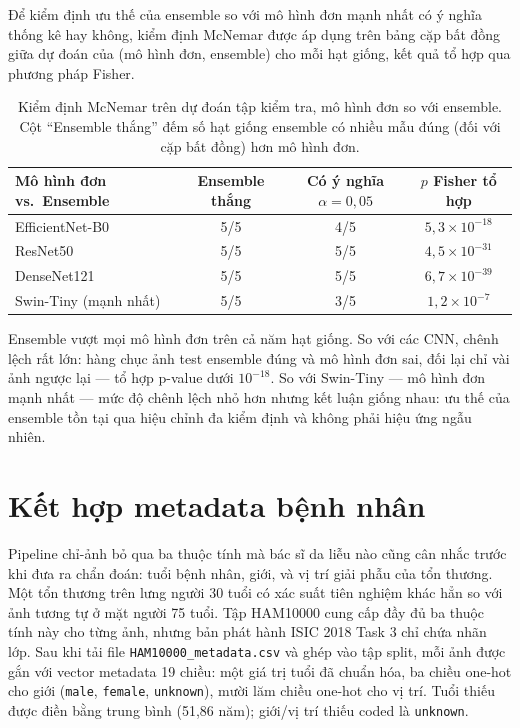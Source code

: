 Để kiểm định ưu thế của ensemble so với mô hình đơn mạnh nhất có ý nghĩa thống kê hay không, kiểm định McNemar được áp dụng trên bảng cặp bất đồng giữa dự đoán của (mô hình đơn, ensemble) cho mỗi hạt giống, kết quả tổ hợp qua phương pháp Fisher.

\begin{table}[H]
\centering
\caption{Kiểm định McNemar trên dự đoán tập kiểm tra, mô hình đơn so với ensemble. Cột ``Ensemble thắng'' đếm số hạt giống ensemble có nhiều mẫu đúng (đối với cặp bất đồng) hơn mô hình đơn.}
\label{tab:mcnemar_vn}
\begin{tabular}{lccc}
\toprule
\textbf{Mô hình đơn vs.\ Ensemble} & \textbf{Ensemble thắng} & \textbf{Có ý nghĩa $\alpha=0{,}05$} & \textbf{$p$ Fisher tổ hợp} \\
\midrule
EfficientNet-B0 & 5/5 & 4/5 & $5{,}3 \times 10^{-18}$ \\
ResNet50        & 5/5 & 5/5 & $4{,}5 \times 10^{-31}$ \\
DenseNet121     & 5/5 & 5/5 & $6{,}7 \times 10^{-39}$ \\
Swin-Tiny (mạnh nhất) & 5/5 & 3/5 & $1{,}2 \times 10^{-7}$ \\
\bottomrule
\end{tabular}
\end{table}

Ensemble vượt mọi mô hình đơn trên cả năm hạt giống. So với các CNN, chênh lệch rất lớn: hàng chục ảnh test ensemble đúng và mô hình đơn sai, đối lại chỉ vài ảnh ngược lại --- tổ hợp p-value dưới $10^{-18}$. So với Swin-Tiny --- mô hình đơn mạnh nhất --- mức độ chênh lệch nhỏ hơn nhưng kết luận giống nhau: ưu thế của ensemble tồn tại qua hiệu chỉnh đa kiểm định và không phải hiệu ứng ngẫu nhiên.

\section{Kết hợp metadata bệnh nhân}

Pipeline chỉ-ảnh bỏ qua ba thuộc tính mà bác sĩ da liễu nào cũng cân nhắc trước khi đưa ra chẩn đoán: tuổi bệnh nhân, giới, và vị trí giải phẫu của tổn thương. Một tổn thương trên lưng người 30 tuổi có xác suất tiên nghiệm khác hẳn so với ảnh tương tự ở mặt người 75 tuổi. Tập HAM10000 cung cấp đầy đủ ba thuộc tính này cho từng ảnh, nhưng bản phát hành ISIC 2018 Task 3 chỉ chứa nhãn lớp. Sau khi tải file \texttt{HAM10000\_metadata.csv} và ghép vào tập split, mỗi ảnh được gắn với vector metadata 19 chiều: một giá trị tuổi đã chuẩn hóa, ba chiều one-hot cho giới (\texttt{male}, \texttt{female}, \texttt{unknown}), mười lăm chiều one-hot cho vị trí. Tuổi thiếu được điền bằng trung bình (51,86 năm); giới/vị trí thiếu coded là \texttt{unknown}.

